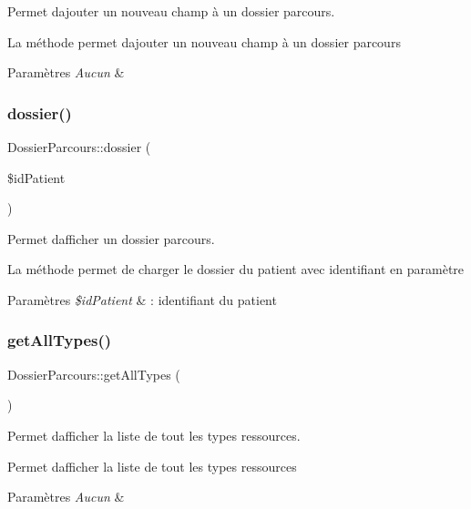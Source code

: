 Permet d\textquotesingle{}ajouter un nouveau champ à un dossier parcours. 

La méthode permet d\textquotesingle{}ajouter un nouveau champ à un dossier parcours 
\begin{DoxyParams}{Paramètres}
{\em Aucun} & \\
\hline
\end{DoxyParams}
\mbox{\label{class_dossier_parcours_a0eddbe2795e708c6173bbdc089e7b8a5}} 
\subsubsection{\texorpdfstring{dossier()}{dossier()}}
{\footnotesize\ttfamily Dossier\+Parcours\+::dossier (\begin{DoxyParamCaption}\item[{}]{\$id\+Patient }\end{DoxyParamCaption})}



Permet d\textquotesingle{}afficher un dossier parcours. 

La méthode permet de charger le dossier du patient avec identifiant en paramètre 
\begin{DoxyParams}{Paramètres}
{\em \$id\+Patient} & \+: identifiant du patient \\
\hline
\end{DoxyParams}
\mbox{\label{class_dossier_parcours_aae7bd65f5931b1985a6bca486e430732}} 
\subsubsection{\texorpdfstring{get\+All\+Types()}{getAllTypes()}}
{\footnotesize\ttfamily Dossier\+Parcours\+::get\+All\+Types (\begin{DoxyParamCaption}{ }\end{DoxyParamCaption})}



Permet d\textquotesingle{}afficher la liste de tout les types ressources. 

Permet d\textquotesingle{}afficher la liste de tout les types ressources 
\begin{DoxyParams}{Paramètres}
{\em Aucun} & \\
\hline
\end{DoxyParams}
\mbox{\label{class_dossier_parcours_aa85c6e4f4f0c615a0a51d3b94574aba2}} 
